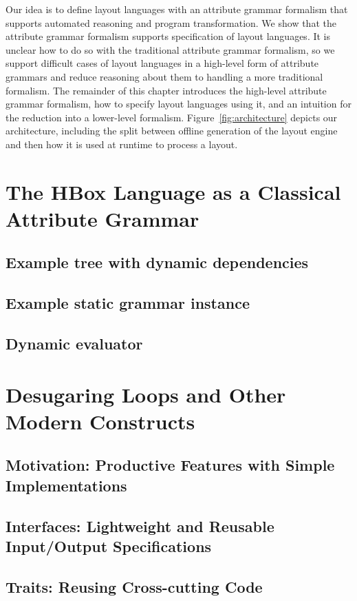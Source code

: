 Our idea is to define layout languages with an attribute grammar formalism that supports automated reasoning and program transformation. We show that the attribute grammar formalism supports specification of layout languages. It is unclear how to do so with the traditional attribute grammar formalism, so we support difficult cases of layout languages in a high-level form of attribute grammars and reduce reasoning about them to handling a more traditional formalism. The remainder of this chapter introduces the high-level attribute grammar formalism, how to specify layout languages using it, and an intuition for the reduction into a lower-level formalism. Figure~\ref{fig:architecture} depicts our architecture, including the split between offline generation of the layout engine and then how it is used at runtime to process a layout.



\section{The HBox Language as a Classical Attribute Grammar}
\subsection{Example tree with dynamic dependencies}
\subsection{Example static grammar instance}
\subsection{Dynamic evaluator}

\section{Desugaring Loops and Other Modern Constructs}
\subsection{Motivation: Productive Features with Simple Implementations}
\subsection{Interfaces: Lightweight and Reusable Input/Output Specifications}
\subsection{Traits: Reusing Cross-cutting Code}

